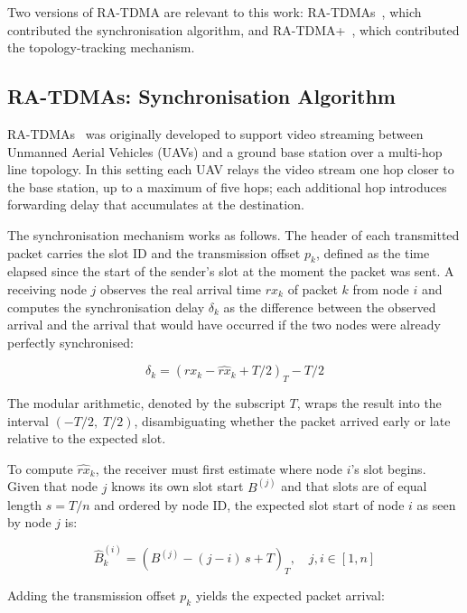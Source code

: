 Two versions of RA-TDMA are relevant to this work: RA-TDMAs~\cite{sousa2012ra},
which contributed the synchronisation algorithm, and
RA-TDMA+~\cite{oliveira2018clockless}, which contributed the
topology-tracking mechanism.

\subsection{RA-TDMAs: Synchronisation Algorithm}
\label{sec:ratdmas-sync}

RA-TDMAs~\cite{sousa2012ra} was originally developed to support video
streaming between Unmanned Aerial Vehicles (UAVs) and a ground base
station over a multi-hop line topology. In this setting each UAV relays
the video stream one hop closer to the base station, up to a maximum of
five hops; each additional hop introduces forwarding delay that
accumulates at the destination.

The synchronisation mechanism works as follows. The header of each
transmitted packet carries the slot ID and the transmission offset
$p_k$, defined as the time elapsed since the start of the sender's
slot at the moment the packet was sent. A receiving node $j$ observes
the real arrival time $rx_k$ of packet $k$ from node $i$ and computes
the synchronisation delay $\delta_k$ as the difference between the
observed arrival and the arrival that would have occurred if the two
nodes were already perfectly synchronised:

\begin{equation}
\delta_k = (rx_k - \hat{rx}_k + T/2)_T - T/2
\label{eq:delay}
\end{equation}

The modular arithmetic, denoted by the subscript $T$, wraps the result
into the interval $(-T/2,\; T/2)$, disambiguating whether the packet
arrived early or late relative to the expected slot.

To compute $\hat{rx}_k$, the receiver must first estimate where node
$i$'s slot begins. Given that node $j$ knows its own slot start
$B^{(j)}$ and that slots are of equal length $s = T/n$ and ordered by
node ID, the expected slot start of node $i$ as seen by node $j$ is:

\begin{equation}
\hat{B}^{(i)}_k = (B^{(j)} - (j - i)\,s + T)_T,
\quad j, i \in [1, n]
\label{eq:expected-slot}
\end{equation}

Adding the transmission offset $p_k$ yields the expected packet arrival:


